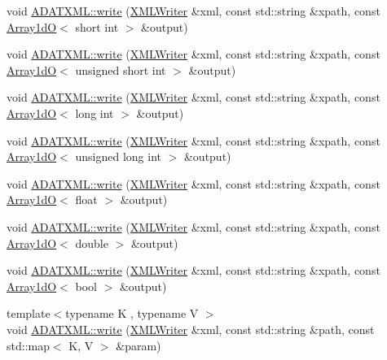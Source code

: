 \begin{DoxyCompactItemize}
\item 
void \mbox{\hyperlink{group__io_ga0490b2b22643afb2ca599baccded2556}{A\+D\+A\+T\+X\+M\+L\+::write}} (\mbox{\hyperlink{classADATXML_1_1XMLWriter}{X\+M\+L\+Writer}} \&xml, const std\+::string \&xpath, const \mbox{\hyperlink{classADAT_1_1Array1dO}{Array1dO}}$<$ short int $>$ \&output)
\item 
void \mbox{\hyperlink{group__io_gada32aa6101427e2983e6507da6d49ff2}{A\+D\+A\+T\+X\+M\+L\+::write}} (\mbox{\hyperlink{classADATXML_1_1XMLWriter}{X\+M\+L\+Writer}} \&xml, const std\+::string \&xpath, const \mbox{\hyperlink{classADAT_1_1Array1dO}{Array1dO}}$<$ unsigned short int $>$ \&output)
\item 
void \mbox{\hyperlink{group__io_ga22d9e5badf27f6d860eeba79ca71243f}{A\+D\+A\+T\+X\+M\+L\+::write}} (\mbox{\hyperlink{classADATXML_1_1XMLWriter}{X\+M\+L\+Writer}} \&xml, const std\+::string \&xpath, const \mbox{\hyperlink{classADAT_1_1Array1dO}{Array1dO}}$<$ long int $>$ \&output)
\item 
void \mbox{\hyperlink{group__io_ga930bf7dd8f7a313ec5f29eacc08d06ba}{A\+D\+A\+T\+X\+M\+L\+::write}} (\mbox{\hyperlink{classADATXML_1_1XMLWriter}{X\+M\+L\+Writer}} \&xml, const std\+::string \&xpath, const \mbox{\hyperlink{classADAT_1_1Array1dO}{Array1dO}}$<$ unsigned long int $>$ \&output)
\item 
void \mbox{\hyperlink{group__io_ga83e5a11ea845805029325ff1c7946f36}{A\+D\+A\+T\+X\+M\+L\+::write}} (\mbox{\hyperlink{classADATXML_1_1XMLWriter}{X\+M\+L\+Writer}} \&xml, const std\+::string \&xpath, const \mbox{\hyperlink{classADAT_1_1Array1dO}{Array1dO}}$<$ float $>$ \&output)
\item 
void \mbox{\hyperlink{group__io_ga60a959cadded600c1c4768075005f76e}{A\+D\+A\+T\+X\+M\+L\+::write}} (\mbox{\hyperlink{classADATXML_1_1XMLWriter}{X\+M\+L\+Writer}} \&xml, const std\+::string \&xpath, const \mbox{\hyperlink{classADAT_1_1Array1dO}{Array1dO}}$<$ double $>$ \&output)
\item 
void \mbox{\hyperlink{group__io_ga17afd14eb981c71780dc1b0074758afc}{A\+D\+A\+T\+X\+M\+L\+::write}} (\mbox{\hyperlink{classADATXML_1_1XMLWriter}{X\+M\+L\+Writer}} \&xml, const std\+::string \&xpath, const \mbox{\hyperlink{classADAT_1_1Array1dO}{Array1dO}}$<$ bool $>$ \&output)
\item 
{\footnotesize template$<$typename K , typename V $>$ }\\void \mbox{\hyperlink{group__io_gaab13ff0d8972a4435cd3590b6c87ea05}{A\+D\+A\+T\+X\+M\+L\+::write}} (\mbox{\hyperlink{classADATXML_1_1XMLWriter}{X\+M\+L\+Writer}} \&xml, const std\+::string \&path, const std\+::map$<$ K, V $>$ \&param)

\end{DoxyCompactItemize}
